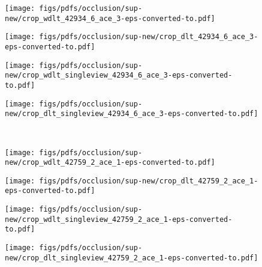 \documentclass[runningheads]{llncs}
\begin{document}
\begin{figure*}
	\begin{subfigure}[b]{0.235\linewidth}        \centering
		\texttt{[image: figs/pdfs/occlusion/sup-new/crop\_wdlt\_42934\_6\_ace\_3-eps-converted-to.pdf]}
\end{subfigure}
	\begin{subfigure}[b]{0.235\linewidth}        \centering
		\texttt{[image: figs/pdfs/occlusion/sup-new/crop\_dlt\_42934\_6\_ace\_3-eps-converted-to.pdf]}
\end{subfigure}
	\begin{subfigure}[b]{0.235\linewidth}        \centering
		\texttt{[image: figs/pdfs/occlusion/sup-new/crop\_wdlt\_singleview\_42934\_6\_ace\_3-eps-converted-to.pdf]}
\end{subfigure}
	\begin{subfigure}[b]{0.235\linewidth}        \centering
		\texttt{[image: figs/pdfs/occlusion/sup-new/crop\_dlt\_singleview\_42934\_6\_ace\_3-eps-converted-to.pdf]}
\end{subfigure}  \\   \vspace{-1mm}
	
	\begin{subfigure}[b]{0.235\linewidth}        \centering
		\texttt{[image: figs/pdfs/occlusion/sup-new/crop\_wdlt\_42759\_2\_ace\_1-eps-converted-to.pdf]}
	\end{subfigure}
	\begin{subfigure}[b]{0.235\linewidth}        \centering
		\texttt{[image: figs/pdfs/occlusion/sup-new/crop\_dlt\_42759\_2\_ace\_1-eps-converted-to.pdf]}
	\end{subfigure}
	\begin{subfigure}[b]{0.235\linewidth}        \centering
		\texttt{[image: figs/pdfs/occlusion/sup-new/crop\_wdlt\_singleview\_42759\_2\_ace\_1-eps-converted-to.pdf]}
	\end{subfigure}
	\begin{subfigure}[b]{0.235\linewidth}        \centering
		\texttt{[image: figs/pdfs/occlusion/sup-new/crop\_dlt\_singleview\_42759\_2\_ace\_1-eps-converted-to.pdf]}
	\end{subfigure} \\ \vspace{-1mm}


\end{figure*}
\end{document}
